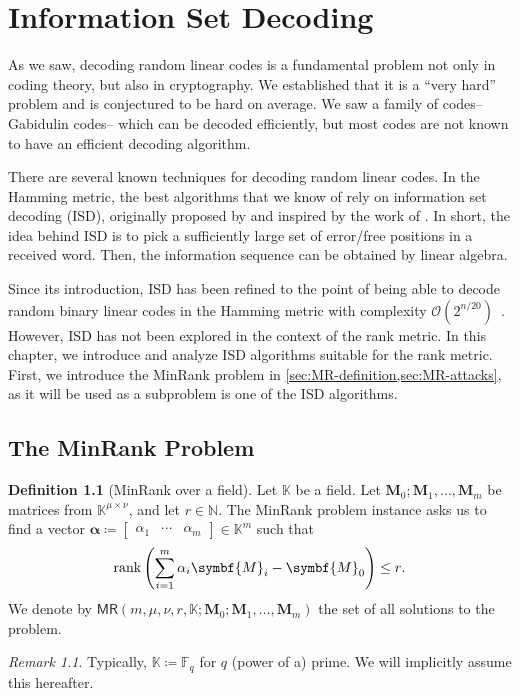 \documentclass[version=last, paper=A4, parskip=half, oneside]{scrbook}
\theoremstyle{plain}
\theoremstyle{definition}
\newtheorem{definition}{Definition}
\theoremstyle{remark}
\newtheorem*{remark}{Remark}
\renewcommand*{\vec}{\symbf}
\newcommand*{\mat}{\symbf}
\DeclareMathOperator{\rank}{rank}
\newcommand*{\KK}{\ensuremath{\mathbb{K}}}
\newcommand*{\FF}{\ensuremath{\mathbb{F}}}
\newcommand*{\NN}{\ensuremath{\mathbb{N}}}
\newcommand*{\MR}{\ensuremath{\mathsf{MR}}}
\begin{document}
\chapter{Information Set Decoding}\label{chap:ISD}

As we saw, decoding random linear codes is a fundamental problem not only in
coding theory, but also in cryptography.  We established that it is a
\enquote{very hard} problem and is conjectured to be hard on average.  We saw a
family of codes\--- Gabidulin codes\--- which can be decoded efficiently, but
most codes are not known to have an efficient decoding algorithm.

There are several known techniques for decoding random linear codes.  In the
Hamming metric, the best algorithms that we know of rely on information set
decoding (ISD), originally proposed by \textcite{Eli78} and inspired by the work
of \textcite{Pra62}.  In short, the idea behind ISD is to pick a sufficiently
large set of error\-/free positions in a received word.  Then, the information
sequence can be obtained by linear algebra.

Since its introduction, ISD has been refined to the point of being able to
decode random binary linear codes in the Hamming metric with complexity
\(\mathcal{O}(2^{n / {20}})\)~\cite{B+12}.  However, ISD has not been explored
in the context of the rank metric.  In this chapter, we introduce and analyze
ISD algorithms suitable for the rank metric.  First, we introduce the MinRank
problem in \cref{sec:MR-definition,sec:MR-attacks}, as it will be used as a
subproblem is one of the ISD algorithms.

\section{The MinRank Problem}\label{sec:MR-definition}

\begin{definition}[MinRank over a field]\label{def:MR}
  Let \(\KK\) be a field.  Let \(\mat{M}_0; \mat{M}_1, \ldots, \mat{M}_m\) be
  matrices from \(\KK^{\mu \times \nu}\), and let \(r \in \NN\).  The MinRank
  problem instance asks us to find a vector
  \(\vec{\alpha} \coloneqq \begin{bmatrix} \alpha_1 & \cdots &
    \alpha_m \end{bmatrix} \in \KK^m\) such that
  \[
    \rank\left(\sum_{i = 1}^{m} \alpha_i \mat{M}_i - \mat{M}_0\right) \le r\text.
  \]
  We denote by
  \(\MR(m, \mu, \nu, r, \KK; \mat{M}_0; \mat{M}_1, \ldots, \mat{M}_m)\) the set
  of all solutions to the problem.
  \begin{remark}
    Typically, \(\KK \coloneqq \FF_q\) for \(q\) (power of a) prime.  We will
    implicitly assume this hereafter.
  \end{remark}
\end{definition}
\end{document}
